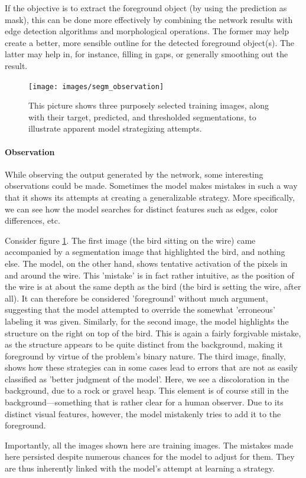 If the objective is to extract the foreground object (by using the prediction as mask), this can be done more effectively by combining the network results with edge detection algorithms and morphological operations. The former may help create a better, more sensible outline for the detected foreground object(s). The latter may help in, for instance, filling in gaps, or generally smoothing out the result.

\begin{figure}[!htbp]
  \begin{center}
    \texttt{[image: images/segm\_observation]}
    \caption{This picture shows three purposely selected training images, along with their target, predicted, and thresholded segmentations, to illustrate apparent model strategizing attempts.}
    \label{fig:segm_observation}
  \end{center}
\end{figure}

\paragraph{Observation} While observing the output generated by the network, some interesting observations could be made. Sometimes the model makes mistakes in such a way that it shows its attempts at creating a generalizable strategy. More specifically, we can see how the model searches for distinct features such as edges, color differences, etc.
	
	Consider figure \ref{fig:segm_observation}. The first image (the bird sitting on the wire) came accompanied by a segmentation image that highlighted the bird, and nothing else. The model, on the other hand, shows tentative activation of the pixels in and around the wire. This 'mistake' is in fact rather intuitive, as the position of the wire is at about the same depth as the bird (the bird is setting the wire, after all). It can therefore be considered 'foreground' without much argument, suggesting that the model attempted to override the somewhat 'erroneous' labeling it was given. Similarly, for the second image, the model highlights the structure on the right on top of the bird. This is again a fairly forgivable mistake, as the structure appears to be quite distinct from the background, making it foreground by virtue of the problem's binary nature. The third image, finally, shows how these strategies can in some cases lead to errors that are not as easily classified as 'better judgment of the model'. Here, we see a discoloration in the background, due to a rock or gravel heap. This element is of course still in the background---something that is rather clear for a human observer. Due to its distinct visual features, however, the model mistakenly tries to add it to the foreground. 
	
	Importantly, all the images shown here are training images. The mistakes made here persisted despite numerous chances for the model to adjust for them. They are thus inherently linked with the model's attempt at learning a strategy.

